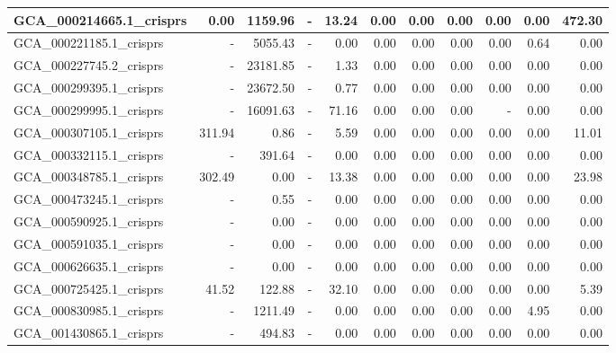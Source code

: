 \documentclass[12pt,a4paper]{article}
\begin{document}
\begin{table}[ht]
\begin{center}
\begin{tabular}{|l*{10}{|r}|}
GCA\_000214665.1\_crisprs & 0.00 & 1159.96 & - & 13.24 & 0.00 & 0.00 & 0.00 & 0.00 & 0.00 & 472.30 \\ \hline
GCA\_000221185.1\_crisprs & - & 5055.43 & - & 0.00 & 0.00 & 0.00 & 0.00 & 0.00 & 0.64 & 0.00 \\ \hline
GCA\_000227745.2\_crisprs & - & 23181.85 & - & 1.33 & 0.00 & 0.00 & 0.00 & 0.00 & 0.00 & 0.00 \\ \hline
GCA\_000299395.1\_crisprs & - & 23672.50 & - & 0.77 & 0.00 & 0.00 & 0.00 & 0.00 & 0.00 & 0.00 \\ \hline
GCA\_000299995.1\_crisprs & - & 16091.63 & - & 71.16 & 0.00 & 0.00 & 0.00 & - & 0.00 & 0.00 \\ \hline
GCA\_000307105.1\_crisprs & 311.94 & 0.86 & - & 5.59 & 0.00 & 0.00 & 0.00 & 0.00 & 0.00 & 11.01 \\ \hline
GCA\_000332115.1\_crisprs & - & 391.64 & - & 0.00 & 0.00 & 0.00 & 0.00 & 0.00 & 0.00 & 0.00 \\ \hline
GCA\_000348785.1\_crisprs & 302.49 & 0.00 & - & 13.38 & 0.00 & 0.00 & 0.00 & 0.00 & 0.00 & 23.98 \\ \hline
GCA\_000473245.1\_crisprs & - & 0.55 & - & 0.00 & 0.00 & 0.00 & 0.00 & 0.00 & 0.00 & 0.00 \\ \hline
GCA\_000590925.1\_crisprs & - & 0.00 & - & 0.00 & 0.00 & 0.00 & 0.00 & 0.00 & 0.00 & 0.00 \\ \hline
GCA\_000591035.1\_crisprs & - & 0.00 & - & 0.00 & 0.00 & 0.00 & 0.00 & 0.00 & 0.00 & 0.00 \\ \hline
GCA\_000626635.1\_crisprs & - & 0.00 & - & 0.00 & 0.00 & 0.00 & 0.00 & 0.00 & 0.00 & 0.00 \\ \hline
GCA\_000725425.1\_crisprs & 41.52 & 122.88 & - & 32.10 & 0.00 & 0.00 & 0.00 & 0.00 & 0.00 & 5.39 \\ \hline
GCA\_000830985.1\_crisprs & - & 1211.49 & - & 0.00 & 0.00 & 0.00 & 0.00 & 0.00 & 4.95 & 0.00 \\ \hline
GCA\_001430865.1\_crisprs & - & 494.83 & - & 0.00 & 0.00 & 0.00 & 0.00 & 0.00 & 0.00 & 0.00 \\ \hline
\end{tabular}
\end{center}
\end{table}
\end{document}
